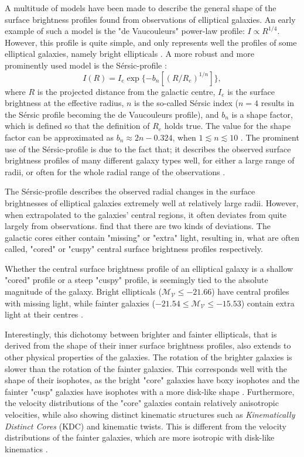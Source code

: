 \documentclass[english, oneside]{HYgradu}
\begin{document}
A multitude of models have been made to describe the general shape of the surface brightness profiles found from observations of elliptical galaxies. An early example of such a model is the "de Vaucouleurs" power-law profile: $I \propto R^{1/4}$. However, this profile is quite simple, and only represents well the profiles of some elliptical galaxies, namely bright ellipticals \citep{MerrittBook}. A more robust and more prominently used model is the Sérsic-profile \citep{Sersic1968}:
\begin{equation}
I (R) = I_e \exp \{ -b_n \left[ (R / R_e)^{1/n} \right] \},
\end{equation}
where $R$ is the projected distance from the galactic centre, $I_e$ is the surface brightness at the effective radius, $n$ is the so-called Sérsic index ($n=4$ results in the Sérsic profile becoming the de Vaucouleurs profile), and $b_n$ is a shape factor, which is defined so that the definition of $R_e$ holds true. The value for the shape factor can be approximated as $b_n \approx 2n - 0.324$, when $1 \lesssim n \lesssim 10$ \citep{BinneyTremaine}. The prominent use of the Sérsic-profile is due to the fact that; it describes the observed surface brightness profiles of many different galaxy types well, for either a large range of radii, or often for the whole radial range of the observations \citep{MerrittBook}.

The Sérsic-profile describes the observed radial changes in the surface brightnesses of elliptical galaxies extremely well at relatively large radii. However, when extrapolated to the galaxies' central regions, it often deviates from quite largely from observations. \cite{Kormendy2009} find that there are two kinds of deviations. The galactic cores either contain "missing" or "extra" light, resulting in, what are often called, "cored" or "cuspy" central surface brightness profiles respectively.

Whether the central surface brightness profile of an elliptical galaxy is a shallow "cored" profile or a steep "cuspy" profile, is seemingly tied to the absolute magnitude of the galaxy. Bright ellipticals ($\mathcal{M_V} \leq -21.66$) have central profiles with missing light, while fainter galaxies ($-21.54 \leq \mathcal{M_V} \leq -15.53$) contain extra light at their centres \citep{Kormendy2009}. 

Interestingly, this dichotomy between brighter and fainter ellipticals, that is derived from the shape of their inner surface brightness profiles, also extends to other physical properties of the galaxies. The rotation of the brighter galaxies is slower than the rotation of the fainter galaxies. This corresponds well with the shape of their isophotes, as the bright "core" galaxies have boxy isophotes and the fainter "cusp" galaxies have isophotes with a more disk-like shape \citep{Faber1997}. Furthermore, the velocity distributions of the "core" galaxies contain relatively anisotropic velocities, while also showing distinct kinematic structures such as \textit{Kinematically Distinct Cores} (KDC) and kinematic twists. This is different from the velocity distributions of the fainter galaxies, which are more isotropic with disk-like kinematics \citep{Kormendy2009, Krajnovic2008}.
\end{document}

